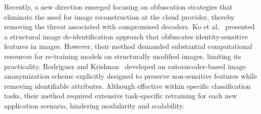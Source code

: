 \documentclass{ieeeaccess}
\begin{document}









Recently, a new direction emerged focusing on obfuscation strategies that eliminate the need for image reconstruction at the cloud provider, thereby removing the threat associated with compromised decoders. Ko et al.~\cite{9129656} presented a structural image de-identification approach that obfuscates identity-sensitive features in images. However, their method demanded substantial computational resources for re-training models on structurally modified images, limiting its practicality. Rodriguez and Krishnan~\cite{10.1007/978-3-031-37586-6_18} developed an autoencoder-based image anonymization scheme explicitly designed to preserve non-sensitive features while removing identifiable attributes. Although effective within specific classification tasks, their method required extensive task-specific retraining for each new application scenario, hindering modularity and scalability.
\end{document}
